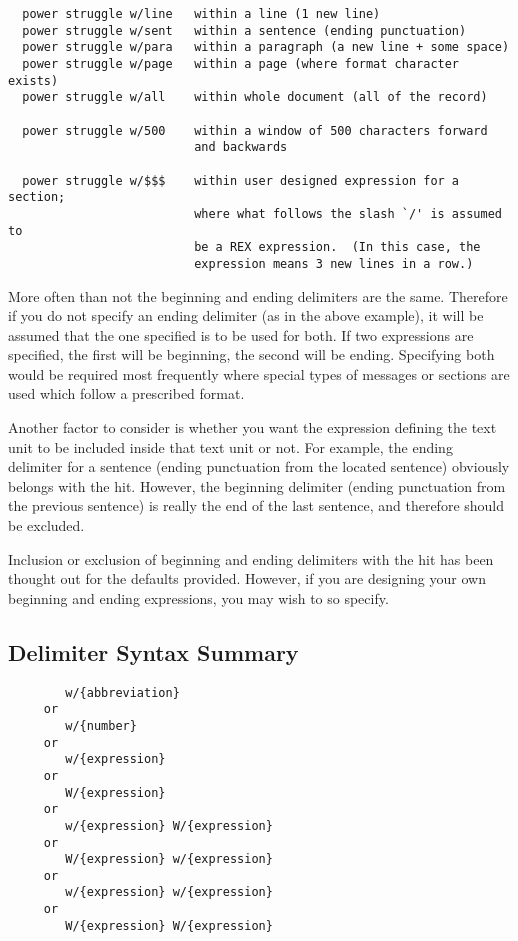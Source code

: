 \begin{verbatim}
  power struggle w/line   within a line (1 new line)
  power struggle w/sent   within a sentence (ending punctuation)
  power struggle w/para   within a paragraph (a new line + some space)
  power struggle w/page   within a page (where format character exists)
  power struggle w/all    within whole document (all of the record)

  power struggle w/500    within a window of 500 characters forward
                          and backwards

  power struggle w/$$$    within user designed expression for a section;
                          where what follows the slash `/' is assumed to
                          be a REX expression.  (In this case, the
                          expression means 3 new lines in a row.)
\end{verbatim}

More often than not the beginning and ending delimiters are the same.
Therefore if you do not specify an ending delimiter (as in the above
example), it will be assumed that the one specified is to be used for
both.  If two expressions are specified, the first will be beginning,
the second will be ending.  Specifying both would be required most
frequently where special types of messages or sections are used which
follow a prescribed format.

Another factor to consider is whether you want the expression defining
the text unit to be included inside that text unit or not.  For
example, the ending delimiter for a sentence (ending punctuation from
the located sentence) obviously belongs with the hit.  However, the
beginning delimiter (ending punctuation from the previous sentence) is
really the end of the last sentence, and therefore should be excluded.

Inclusion or exclusion of beginning and ending delimiters with the hit
has been thought out for the defaults provided.
However, if you are designing your own beginning and ending
expressions, you may wish to so specify.

\subsection{Delimiter Syntax Summary}

\begin{verbatim}
        w/{abbreviation}
     or
        w/{number}
     or
        w/{expression}
     or
        W/{expression}
     or
        w/{expression} W/{expression}
     or
        W/{expression} w/{expression}
     or
        w/{expression} w/{expression}
     or
        W/{expression} W/{expression}
\end{verbatim}

